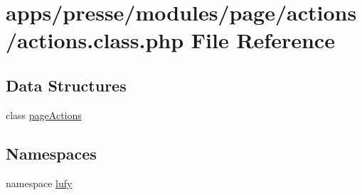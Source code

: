 \hypertarget{presse_2modules_2page_2actions_2actions_8class_8php}{\section{apps/presse/modules/page/actions/actions.class.\-php File Reference}
\label{presse_2modules_2page_2actions_2actions_8class_8php}
}
\subsection*{Data Structures}
\begin{DoxyCompactItemize}
\item 
class \hyperlink{classpage_actions}{page\-Actions}
\end{DoxyCompactItemize}
\subsection*{Namespaces}
\begin{DoxyCompactItemize}
\item 
namespace \hyperlink{namespacelufy}{lufy}
\end{DoxyCompactItemize}
